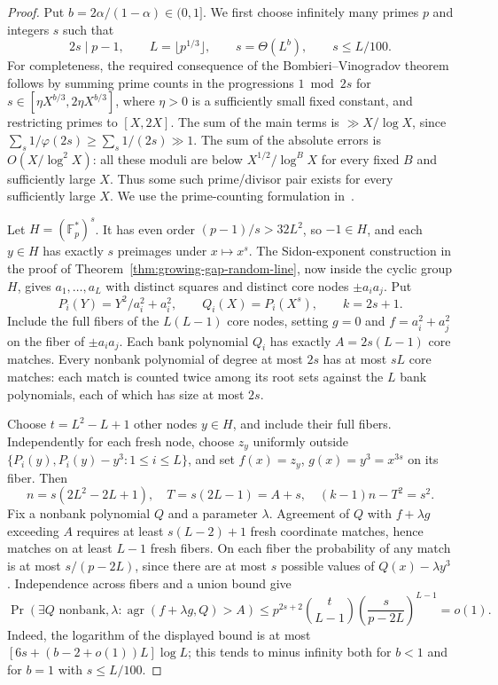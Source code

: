 \begin{proof}
Put $b=2\alpha/(1-\alpha)\in(0,1]$.
We first choose infinitely many primes $p$ and integers $s$ such that
\[
 2s\mid p-1,\qquad L=\lfloor p^{1/3}\rfloor,\qquad
 s=\Theta(L^b),\qquad s\le L/100.
\]
For completeness, the required consequence of the Bombieri--Vinogradov
 theorem follows by summing prime counts in the progressions $1\bmod 2s$
for $s\in[\eta X^{b/3},2\eta X^{b/3}]$, where $\eta>0$ is a sufficiently
small fixed constant, and restricting primes to $[X,2X]$.
The sum of the main terms is $\gg X/\log X$, since
$\sum_s1/\varphi(2s)\ge\sum_s1/(2s)\gg1$.
The sum of the absolute errors is $O(X/\log^2X)$: all these moduli
are below $X^{1/2}/\log^B X$ for every fixed $B$ and sufficiently large $X$.
Thus some such prime/divisor pair exists for every sufficiently large $X$.
We use the prime-counting formulation in~\cite[Theorem~7.1]{harper-bv}.

Let $H=(\mathbb F_p^*)^s$. It has even order $(p-1)/s>32L^2$, so
$-1\in H$, and each $y\in H$ has exactly $s$ preimages under $x\mapsto x^s$.
The Sidon-exponent construction in the proof of
Theorem~\ref{thm:growing-gap-random-line}, now inside the cyclic group $H$,
gives $a_1,\ldots,a_L$ with distinct squares and distinct core nodes
$\pm a_i a_j$. Put
\[
 P_i(Y)=Y^2/a_i^2+a_i^2,\qquad Q_i(X)=P_i(X^s),\qquad k=2s+1.
\]
Include the full fibers of the $L(L-1)$ core nodes, setting $g=0$ and
$f=a_i^2+a_j^2$ on the fiber of $\pm a_i a_j$.
Each bank polynomial $Q_i$ has exactly $A=2s(L-1)$ core matches.
Every nonbank polynomial of degree at most $2s$ has at most $sL$ core
matches: each match is counted twice among its root sets against the
$L$ bank polynomials, each of which has size at most $2s$.

Choose $t=L^2-L+1$ other nodes $y\in H$, and include their full fibers.
Independently for each fresh node, choose $z_y$ uniformly outside
$\{P_i(y),P_i(y)-y^3:1\le i\le L\}$, and set
$f(x)=z_y$, $g(x)=y^3=x^{3s}$ on its fiber. Then
\[
 n=s(2L^2-2L+1),\quad T=s(2L-1)=A+s,\quad (k-1)n-T^2=s^2.
\]
Fix a nonbank polynomial $Q$ and a parameter $\lambda$.
Agreement of $Q$ with $f+\lambda g$ exceeding $A$ requires at least
$s(L-2)+1$ fresh coordinate matches, hence matches on at least $L-1$
fresh fibers. On each fiber the probability of any match is at most
$s/(p-2L)$, since there are at most $s$ possible values of
$Q(x)-\lambda y^3$. Independence across fibers and a union bound give
\[
 \Pr(\exists Q\text{ nonbank},\lambda:
       \operatorname{agr}(f+\lambda g,Q)>A)
 \le p^{2s+2}\binom{t}{L-1}
       \left(\frac{s}{p-2L}\right)^{L-1}=o(1).
\]
Indeed, the logarithm of the displayed bound is at most
$[6s+(b-2+o(1))L]\log L$; this tends to minus infinity both for $b<1$
and for $b=1$ with $s\le L/100$.


\end{proof}
